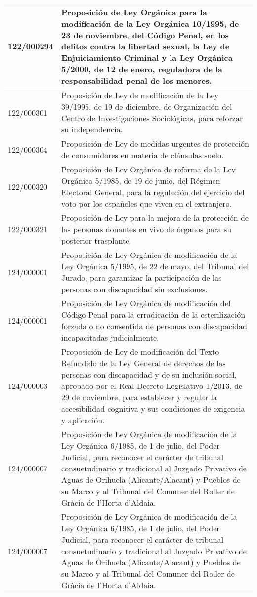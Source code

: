 {\begin{table}[H]
\begin{center}
\begin{tabularx}{\linewidth}{| l | X |}
\hline
122/000294 & Proposición de Ley Orgánica para la modificación de la Ley Orgánica 10/1995, de 23 de noviembre, del Código Penal, en los delitos contra la libertad sexual, la Ley de Enjuiciamiento Criminal y la Ley Orgánica 5/2000, de 12 de enero, reguladora de la responsabilidad penal de los menores. \\
\hline
122/000301 & Proposición de Ley de modificación de la Ley 39/1995, de 19 de diciembre, de Organización del Centro de Investigaciones Sociológicas, para reforzar su independencia. \\
\hline
122/000304 & Proposición de Ley de medidas urgentes de protección de consumidores en materia de cláusulas suelo. \\
\hline
122/000320 & Proposición de Ley Orgánica de reforma de la Ley Orgánica 5/1985, de 19 de junio, del Régimen Electoral General, para la regulación del ejercicio del voto por los españoles que viven en el extranjero. \\
\hline
122/000321 & Proposición de Ley para la mejora de la protección de las personas donantes en vivo de órganos para su posterior trasplante. \\
\hline
124/000001 & Proposición de Ley Orgánica de modificación de la Ley Orgánica 5/1995, de 22 de mayo, del Tribunal del Jurado, para garantizar la participación de las personas con discapacidad sin exclusiones. \\
\hline
124/000001 & Proposición de Ley Orgánica de modificación del Código Penal para la erradicación de la esterilización forzada o no consentida de personas con discapacidad incapacitadas judicialmente. \\
\hline
124/000003 & Proposición de Ley de modificación del Texto Refundido de la Ley General de derechos de las personas con discapacidad y de su inclusión social, aprobado por el Real Decreto Legislativo 1/2013, de 29 de noviembre, para establecer y regular la accesibilidad cognitiva y sus condiciones de exigencia y aplicación. \\
\hline
124/000007 & Proposición de Ley Orgánica de modificación de la Ley Orgánica 6/1985, de 1 de julio, del Poder Judicial, para reconocer el carácter de tribunal consuetudinario y tradicional al Juzgado Privativo de Aguas de Orihuela (Alicante/Alacant) y Pueblos de su Marco y al Tribunal del Comuner del Roller de Gràcia de l'Horta d'Aldaia. \\
\hline
124/000007 & Proposición de Ley Orgánica de modificación de la Ley Orgánica 6/1985, de 1 de julio, del Poder Judicial, para reconocer el carácter de tribunal consuetudinario y tradicional al Juzgado Privativo de Aguas de Orihuela (Alicante/Alacant) y Pueblos de su Marco y al Tribunal del Comuner del Roller de Gràcia de l'Horta d'Aldaia. \\

\end{tabularx}
\end{center}
\end{table}}

